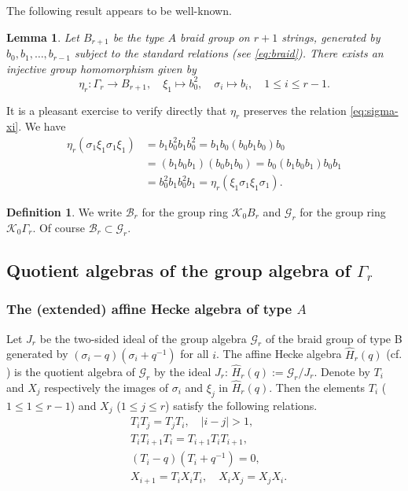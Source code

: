 \documentclass[12pt]{amsart}
\newtheorem{lemma}[theorem]{Lemma}
\theoremstyle{definition}
\newtheorem{definition}[theorem]{Definition}
\theoremstyle{remark}
\numberwithin{equation}{section}
\newcommand{\mc}{\mathcal}
\newcommand{\CG}{{\mathcal G}}
\newcommand{\CK}{{\mathcal K}}
\newcommand{\cB}{\mc B}
\newcommand{\be}{\begin{equation}}
\newcommand{\ee}{\end{equation}}
\newcommand{\HH}{\widehat{H}}
\begin{document}
The following result appears to be well-known.
\begin{lemma} \label{lem:aff-fin}
Let $B_{r+1}$ be the type $A$ braid group on $r+1$ strings, generated by $b_0, b_1, \dots, b_{r-1}$ subject to the standard relations (see \eqref{eq:braid}).  
There exists an injective group homomorphism given by 
\[
\eta_r: \Gamma_r \longrightarrow B_{r+1}, \quad \xi_1\mapsto b_0^2, \quad \sigma_i \mapsto b_i, \quad 1\le i\le r-1.  
\]
\end{lemma}
It is a pleasant exercise to verify directly that $\eta_r$ preserves the relation \eqref{eq:sigma-xi}.  
We have 
\[
\begin{aligned}
\eta_r(\sigma_1 \xi_1 \sigma_1 \xi_1 )&=b_1 b_0^2 b_1 b_0^2 = b_1 b_0 (b_0 b_1 b_0) b_0  \\
&=   (b_1 b_0 b_1) (b_0 b_1 b_0)=b_0 (b_1 b_0 b_1) b_0 b_1\\
& = b_0 ^2 b_1 b_0 ^2 b_1= \eta_r(\xi_1 \sigma_1 \xi_1\sigma_1).
\end{aligned}
\]

\begin{definition}\label{def:grprings}
We write $\cB_r$ for the group ring $\CK_0 B_r$ and $\CG_r$ for the group ring $\CK_0 \Gamma_r$. Of
course $\cB_r\subset \CG_r$.
\end{definition}



%
%
\subsection{Quotient algebras of the group algebra of $\Gamma_r$}
%
%
%
\subsubsection{The (extended) affine Hecke algebra of type $A$}
%
%


Let $J_r$ be the two-sided ideal of the group algebra  $\CG_r$ of the braid group of type B generated by $(\sigma_i -q)(\sigma_i +q^{-1})$ for all $i$.
The affine Hecke algebra $\HH_r(q)$ (cf. \cite[Def. (3.1)]{GL03}) is the quotient algebra of $\CG_r$ by the ideal $J_r$:
$
\HH_r(q):= \CG_r/J_r.
$
Denote by $T_i$ and $X_j$ respectively the images of $\sigma_i$  and $\xi_j$  in $\HH_r(q)$.  Then the elements $T_i$ ($1\le 1\le r-1$) and $X_j$ ($1\le j\le r$)
satisfy the following relations.
\be\label{eq:ha}
\begin{aligned}
&T_i T_j = T_j T_i, \quad |i-j|>1, \\
&T_i T_{i+1} T_i = T_{i+1} T_i T_{i+1}, \\
&(T_i -q)(T_i +q^{-1})=0, \\
&X_{i+1} = T_i X_i T_i, \quad X_i X_j =X_j X_i.
\end{aligned}
\ee
\end{document}
